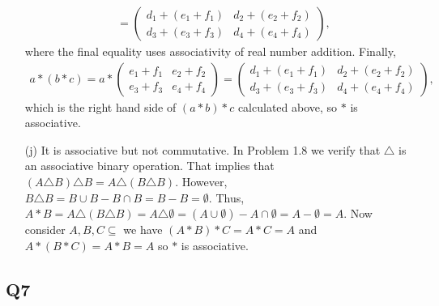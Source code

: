 \documentclass[12pt]{article}
\numberwithin{theorem}{section}
\numberwithin{equation}{section}
\numberwithin{remark}{section}
\numberwithin{definition}{section}
\numberwithin{theorem}{section}
\numberwithin{lemma}{section}
\numberwithin{example}{section}
\begin{document}
\begin{itemize}
{\begin{align*}
			&=\begin{pmatrix} d_1+(e_1+f_1) & d_2+(e_2+f_2) \\ d_3+(e_3+f_3) & d_4+(e_4+f_4) \end{pmatrix},
		\end{align*}
	where the final equality uses associativity of real number addition. Finally, 
		\begin{align*}
			a*(b*c)=a*\begin{pmatrix} e_1+f_1 & e_2+f_2 \\ e_3+f_3 & e_4+f_4 \end{pmatrix}=\begin{pmatrix} d_1+(e_1+f_1) & d_2+(e_2+f_2) \\ d_3+(e_3+f_3) & d_4+(e_4+f_4) \end{pmatrix},
		\end{align*}
	which is the right hand side of $(a*b)*c$ calculated above, so $*$ is associative.}
	\item[(j)]{It is associative but not commutative. In Problem 1.8 we verify that $\triangle$ is an associative binary operation. That implies that $(A\triangle B)\triangle B=A\triangle (B \triangle B)$. However, $B \triangle B= B \cup B - B\cap B = B - B = \emptyset$. Thus, $A*B=A\triangle (B \triangle B)=A \triangle \emptyset = (A\cup \emptyset)-A\cap\emptyset=A-\emptyset=A$. Now consider $A,B,C\subseteq$ we have $(A*B)*C=A*C=A$ and $A*(B*C)=A*B=A$ so $*$ is associative.}
\end{itemize}

\subsection{Q7}
\end{document}
